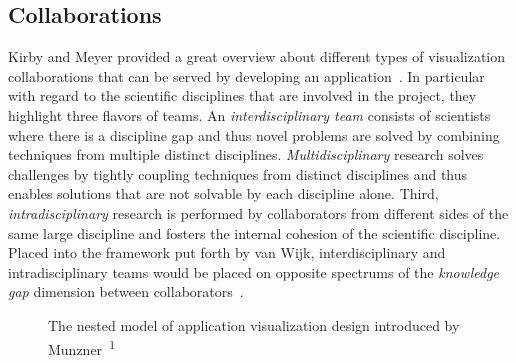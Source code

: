 \subsection{Collaborations} \label{cha:intro:appl:collab}
Kirby and Meyer provided a great overview about different types of visualization collaborations that can be served by developing an application~\cite{kirby2013visualization}.  In particular with regard to the scientific disciplines that are involved in the project, they highlight three flavors of teams. An \emph{interdisciplinary team} consists of scientists where there is a discipline gap and thus novel problems are solved by combining techniques from multiple distinct disciplines.  \emph{Multidisciplinary} research solves challenges by tightly coupling techniques from distinct disciplines and thus enables solutions that are not solvable by each discipline alone.  Third, \emph{intradisciplinary} research is performed by collaborators from different sides of the same large discipline and fosters the internal cohesion of the scientific discipline.  Placed into the framework put forth by van Wijk, interdisciplinary and intradisciplinary teams would be placed on opposite spectrums of the \emph{knowledge gap} dimension between collaborators~\cite{van2006bridging}.

\begin{figure}
  \centering
  \caption{The nested model of application visualization design introduced by Munzner~\cite{munzner2009nested}\textsuperscript{1}}
  \label{fig:intro:appl:nested}
\end{figure}


